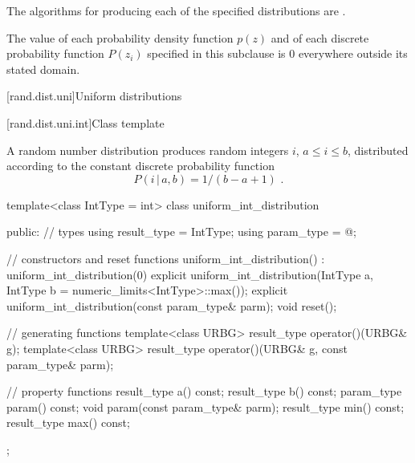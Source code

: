 \pnum
The algorithms for producing each
of the specified distributions are
.

\pnum
The value of each probability density function $p(z)$
and of each discrete probability function $P(z_i)$
specified in this subclause
is $0$
everywhere outside its stated domain.


[rand.dist.uni]{Uniform distributions}%
%


[rand.dist.uni.int]{Class template }%
%
%

\pnum
A  random number distribution
produces random integers $i$,
$a \leq i \leq b$,
distributed according to
the constant discrete probability function%
%
%
\[  P(i\,|\,a,b) = 1 / (b - a + 1) \text{ .} \]

%
\begin{codeblock}
template<class IntType = int>
  class uniform_int_distribution {
  public:
    // types
    using result_type = IntType;
    using param_type  = @\unspec@;

    // constructors and reset functions
    uniform_int_distribution() : uniform_int_distribution(0) {}
    explicit uniform_int_distribution(IntType a, IntType b = numeric_limits<IntType>::max());
    explicit uniform_int_distribution(const param_type& parm);
    void reset();

    // generating functions
    template<class URBG>
      result_type operator()(URBG& g);
    template<class URBG>
      result_type operator()(URBG& g, const param_type& parm);

    // property functions
    result_type a() const;
    result_type b() const;
    param_type param() const;
    void param(const param_type& parm);
    result_type min() const;
    result_type max() const;
  };
\end{codeblock}


